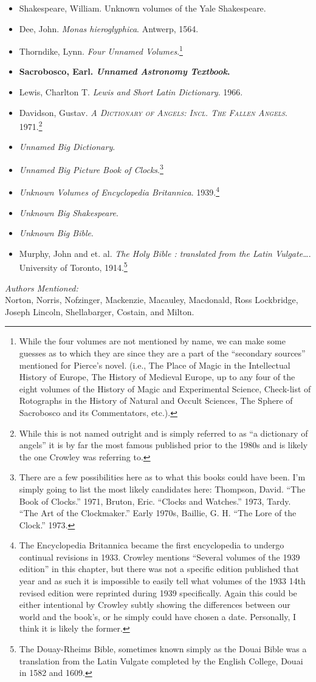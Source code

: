 \documentclass[twoside,10pt]{report}
\begin{document}
\begin{itemize}
\item Shakespeare, William. Unknown volumes of the Yale Shakespeare.
\item Dee, John. \textit{Monas hieroglyphica}. Antwerp, 1564.\cite{Dee}
\item Thorndike, Lynn. \textit{Four Unnamed Volumes}.\footnote{While the four volumes are not mentioned by name, we can make some guesses as to which they are since they are a part of the “secondary sources” mentioned for Pierce’s novel. (i.e., The Place of Magic in the Intellectual History of Europe, The History of Medieval Europe, up to any four of the eight volumes of the History of Magic and Experimental Science, Check-list of Rotographs in the History of Natural and Occult Sciences, The Sphere of Sacrobosco and its Commentators, etc.).}
\item \textbf{Sacrobosco, Earl. \textit{Unnamed Astronomy Textbook}.}
\item Lewis, Charlton T. \textit{Lewis and Short Latin Dictionary}. 1966.\cite{Lewis1966}
\item Davidson, Gustav. \textit{\textsc{A Dictionary of Angels: Incl. The Fallen Angels}}. 1971.\cite{Davidson1971}\footnote{While this is not named outright and is simply referred to as “a dictionary of angels” it is by far the
most famous published prior to the 1980s and is likely the one Crowley was referring to.}
\item \textit{Unnamed Big Dictionary}.
\item \textit{Unnamed Big Picture Book of Clocks}.\footnote{There are a few possibilities here as to what this books could have been. I’m simply going to list the most likely candidates here: Thompson, David. “The Book of Clocks.” 1971, Bruton, Eric. “Clocks and Watches.”
1973, Tardy. “The Art of the Clockmaker.” Early 1970s, Baillie, G. H. “The Lore of the Clock.” 1973.}
\item \textit{Unknown Volumes of Encyclopedia Britannica}. 1939.\footnote{The Encyclopedia Britannica became the first encyclopedia to undergo continual revisions in 1933.
Crowley mentions “Several volumes of the 1939 edition” in this chapter, but there was not a specific edition published that year and as such it is impossible to easily tell what volumes of the 1933 14th revised edition were reprinted during 1939 specifically. Again this could be either intentional by Crowley subtly showing the differences between our world and the book’s, or he simply could have chosen a date. Personally, I think it is likely the former.}
\item \textit{Unknown Big Shakespeare}.
\item \textit{Unknown Big Bible}.
\item Murphy, John and et. al. \textit{The Holy Bible : translated from the Latin Vulgate\ldots}. University of Toronto, 1914.\footnote{The Douay-Rheims Bible, sometimes known simply as the Douai Bible was a translation from the Latin Vulgate completed by the English College, Douai in 1582 and 1609.}
\end{itemize}
\textit{Authors Mentioned:}\\
Norton, Norris, Nofzinger, Mackenzie, Macauley, Macdonald, Ross Lockbridge, Joseph Lincoln, Shellabarger, Costain, and Milton.
\end{document}
